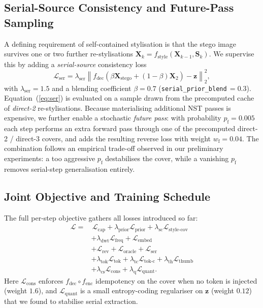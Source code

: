 \documentclass[runningheads]{llncs}
\begin{document}
\subsection{Serial-Source Consistency and Future-Pass Sampling}
\label{sec:serial}
A defining requirement of self-contained stylisation is that the stego image survives one or two further re-stylisations $\mathbf{X}_{k}\!=\!f_{\text{style}}(\mathbf{X}_{k-1},\mathbf{S}_{k})$. We supervise this by adding a \emph{serial-source} consistency loss
\begin{equation}
    \mathcal{L}_{\text{ser}} = \lambda_{\text{ser}}\!\left\|f_{\text{dec}}\!\left(\beta\mathbf{X}_{\text{stego}}+(1-\beta)\mathbf{X}_{2}\right)-\mathbf{z}\right\|_2^{2},
    \label{eq:ser}
\end{equation}
with $\lambda_{\text{ser}}\!=\!1.5$ and a blending coefficient $\beta\!=\!0.7$ (\texttt{serial\_prior\_blend}\,$=0.3$). Equation~(\ref{eq:ser}) is evaluated on a sample drawn from the precomputed cache of \emph{direct-2} re-stylisations. Because materialising additional NST passes is expensive, we further enable a stochastic \emph{future pass}: with probability $p_{\text{f}}\!=\!0.005$ each step performs an extra forward pass through one of the precomputed direct-2 / direct-3 covers, and adds the resulting reverse loss with weight $w_{\text{f}}\!=\!0.04$. The combination follows an empirical trade-off observed in our preliminary experiments: a too aggressive $p_{\text{f}}$ destabilises the cover, while a vanishing $p_{\text{f}}$ removes serial-step generalisation entirely.

\subsection{Joint Objective and Training Schedule}
\label{sec:total}
The full per-step objective gathers all losses introduced so far:
\begin{equation}
\begin{aligned}
\mathcal{L} =&\, \mathcal{L}_{\text{cap}} + \lambda_{\text{prior}}\mathcal{L}_{\text{prior}} + \lambda_{\text{sc}}\mathcal{L}_{\text{style-cov}} \\
& + \lambda_{\text{dwt}}\mathcal{L}_{\text{freq}} + \mathcal{L}_{\text{embed}} \\
& + \mathcal{L}_{\text{rev}} + \mathcal{L}_{\text{oracle}} + \mathcal{L}_{\text{ser}} \\
& + \lambda_{\text{tok}}\mathcal{L}_{\text{tok}} + \lambda_{\text{tc}}\mathcal{L}_{\text{tok-c}} + \lambda_{\text{th}}\mathcal{L}_{\text{thumb}} \\
& + \lambda_{\text{cs}}\mathcal{L}_{\text{cons}} + \lambda_{\text{q}}\mathcal{L}_{\text{quant}}.
\end{aligned}
\label{eq:total}
\end{equation}
Here $\mathcal{L}_{\text{cons}}$ enforces $f_{\text{dec}}\!\circ\!f_{\text{enc}}$ idempotency on the cover when no token is injected (weight $1.6$), and $\mathcal{L}_{\text{quant}}$ is a small entropy-coding regulariser on $\mathbf{z}$ (weight $0.12$) that we found to stabilise serial extraction.
\end{document}
